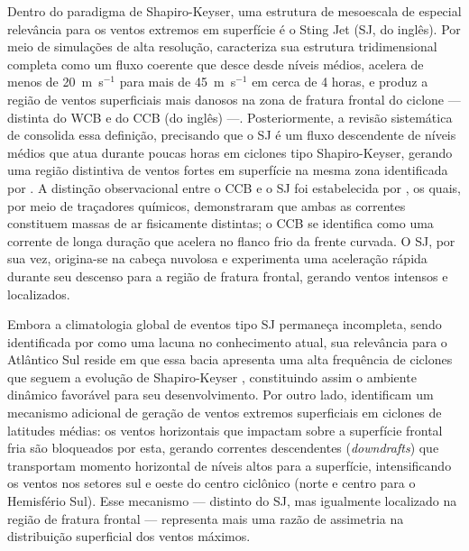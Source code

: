 Dentro do paradigma de Shapiro-Keyser, uma estrutura de mesoescala de especial relevância para os ventos extremos em superfície é o Sting Jet (SJ, do inglês). Por meio de simulações de alta resolução, \citet{clark2005sting} caracteriza sua estrutura tridimensional completa como um fluxo coerente que desce desde níveis médios, acelera de menos de 20~m~s$^{-1}$ para mais de 45~m~s$^{-1}$ em cerca de 4 horas, e produz a região de ventos superficiais mais danosos na zona de fratura frontal do ciclone — distinta do WCB e do CCB (do inglês) —. Posteriormente, a revisão sistemática de \citet{clark2018sting} consolida essa definição, precisando que o SJ é um fluxo descendente de níveis médios que atua durante poucas horas em ciclones tipo Shapiro-Keyser, gerando uma região distintiva de ventos fortes em superfície na mesma zona identificada por \citet{clark2005sting}.
A distinção observacional entre o CCB e o SJ foi estabelecida por \citet{martinez2014cold}, os quais, por meio de traçadores químicos, demonstraram que ambas as correntes constituem massas de ar fisicamente distintas; o CCB se identifica como uma corrente de longa duração que acelera no flanco frio da frente curvada. O SJ, por sua vez, origina-se na cabeça nuvolosa e experimenta uma aceleração rápida durante seu descenso para a região de fratura frontal, gerando ventos intensos e localizados.

Embora a climatologia global de eventos tipo SJ permaneça incompleta, sendo identificada por \citet{clark2018sting} como uma lacuna no conhecimento atual, sua relevância para o Atlântico Sul reside em que essa bacia apresenta uma alta frequência de ciclones que seguem a evolução de Shapiro-Keyser \citep{gozzo2013air}, constituindo assim o ambiente dinâmico favorável para seu desenvolvimento. Por outro lado, \citet{hyeok2024extrem} identificam um mecanismo adicional de geração de ventos extremos superficiais em ciclones de latitudes médias: os ventos horizontais que impactam sobre a superfície frontal fria são bloqueados por esta, gerando correntes descendentes (\textit{downdrafts}) que transportam momento horizontal de níveis altos para a superfície, intensificando os ventos nos setores sul e oeste do centro ciclônico (norte e centro para o Hemisfério Sul). Esse mecanismo — distinto do SJ, mas igualmente localizado na região de fratura frontal — representa mais uma razão de assimetria na distribuição superficial dos ventos máximos. 

